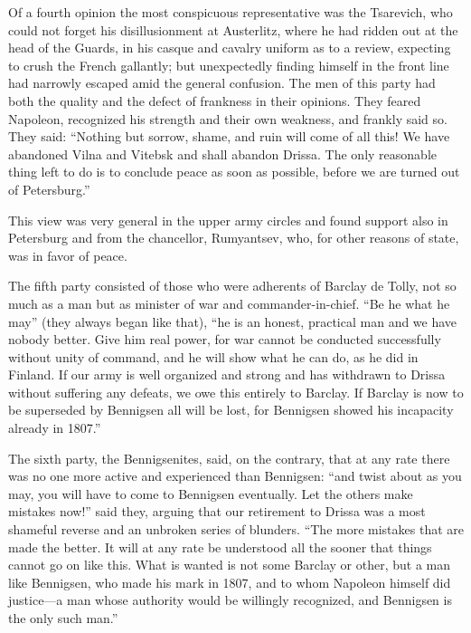 Of a fourth opinion the most conspicuous representative was the
Tsarevich, who could not forget his disillusionment at
Austerlitz, where he had ridden out at the head of the Guards, in
his casque and cavalry uniform as to a review, expecting to crush
the French gallantly; but unexpectedly finding himself in the
front line had narrowly escaped amid the general confusion. The
men of this party had both the quality and the defect of
frankness in their opinions. They feared Napoleon, recognized his
strength and their own weakness, and frankly said so.  They said:
``Nothing but sorrow, shame, and ruin will come of all this!  We
have abandoned Vilna and Vitebsk and shall abandon Drissa. The
only reasonable thing left to do is to conclude peace as soon as
possible, before we are turned out of Petersburg.''

This view was very general in the upper army circles and found
support also in Petersburg and from the chancellor, Rumyantsev,
who, for other reasons of state, was in favor of peace.

The fifth party consisted of those who were adherents of Barclay
de Tolly, not so much as a man but as minister of war and
commander-in-chief. ``Be he what he may'' (they always began like
that), ``he is an honest, practical man and we have nobody
better. Give him real power, for war cannot be conducted
successfully without unity of command, and he will show what he
can do, as he did in Finland. If our army is well organized and
strong and has withdrawn to Drissa without suffering any defeats,
we owe this entirely to Barclay. If Barclay is now to be
superseded by Bennigsen all will be lost, for Bennigsen showed
his incapacity already in 1807.''

The sixth party, the Bennigsenites, said, on the contrary, that
at any rate there was no one more active and experienced than
Bennigsen: ``and twist about as you may, you will have to come to
Bennigsen eventually.  Let the others make mistakes now!'' said
they, arguing that our retirement to Drissa was a most shameful
reverse and an unbroken series of blunders. ``The more mistakes
that are made the better. It will at any rate be understood all
the sooner that things cannot go on like this.  What is wanted is
not some Barclay or other, but a man like Bennigsen, who made his
mark in 1807, and to whom Napoleon himself did justice---a man
whose authority would be willingly recognized, and Bennigsen is
the only such man.''

